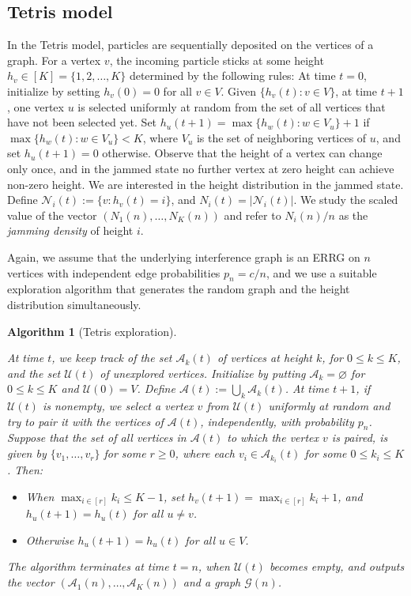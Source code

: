 \documentclass[11pt,a4paper, reqno]{article}
\newtheorem{algo}{Algorithm}
\begin{document}
\subsection{Tetris model}
In the Tetris model, particles are sequentially deposited on the vertices of a graph. For a vertex $v$, the incoming particle sticks at some height $h_v\in [K]=\{1,2,\ldots,K\}$ determined  by the following rules:
At time $t=0$, initialize by setting $h_v(0)=0$ for all $v\in V$. Given $\{h_v(t):v\in V\}$, at time $t+1$, one vertex $u$ is selected uniformly at random  from the set of all vertices that have not been selected yet. Set $h_u(t+1)=\max\{h_w(t):w\in V_u\}+1$ if $\max\{h_w(t):w\in V_u\}<K$, where $V_u$ is the set of neighboring vertices of $u$, and  set $h_u(t+1)=0$ otherwise.
Observe that the height of a vertex can change only once, and in the jammed state no further vertex at zero height can achieve non-zero height.
We are interested in the height distribution in the jammed state. Define $\mathcal{N}_i(t):=\{v:h_v(t)=i\}$, and $N_i(t)=|\mathcal{N}_i(t)|$.
We study the scaled value of the vector $(N_1(n),\ldots, N_K(n))$ and refer to $N_i(n)/n$ as the \emph{jamming density} of height $i$.

Again, we assume that the underlying interference graph is an ERRG on $n$ vertices with independent edge probabilities $p_n=c/n$, and we use a suitable exploration algorithm that generates the random graph and the height distribution simultaneously.
\begin{algo}[{Tetris exploration}]\label{algo-tetris}
{\normalfont
At time $t$, we keep track of the set  $\mathcal{A}_k(t)$ of vertices at height $k$, for $0\leq k\leq K$, and the set $\mathcal{U}(t)$ of unexplored vertices. Initialize by putting $\mathcal{A}_{k}=\varnothing$ for $0\leq k\leq K$ and $\mathcal{U}(0)=V$.
Define $\mathcal{A}(t):=\bigcup_{k}\mathcal{A}_k(t)$. At time $t+1$, if $\mathcal{U}(t)$ is nonempty, we select a vertex $v$ from $\mathcal{U}(t)$ uniformly at random and try to pair it with the vertices of $\mathcal{A}(t)$, independently, with probability $p_n$.
 Suppose that the set of all vertices in $\mathcal{A}(t)$ to which the vertex $v$ is paired, is given by $\{v_1,\dots,v_r\}$ for some $r\geq 0$, where each $v_i\in \mathcal{A}_{k_i}(t)$ for some $0\leq k_i\leq K$. Then:
\begin{itemize}
\item When $\max_{i\in[r]} k_i\leq K-1$, set $h_v(t+1)=\max_{i\in[r]} k_i+1$, and $h_u(t+1)=h_u(t)$ for all $u\neq v$.
\item Otherwise $h_u(t+1)=h_u(t)$ for all $u\in V$.
\end{itemize}
The algorithm terminates at time $t=n$, when $\mathcal{U}(t)$ becomes empty, and outputs the  vector $(\mathcal{A}_1(n),\ldots,\mathcal{A}_K(n))$ and a graph $\mathcal{G}(n)$.
}
\end{algo}
\end{document}
